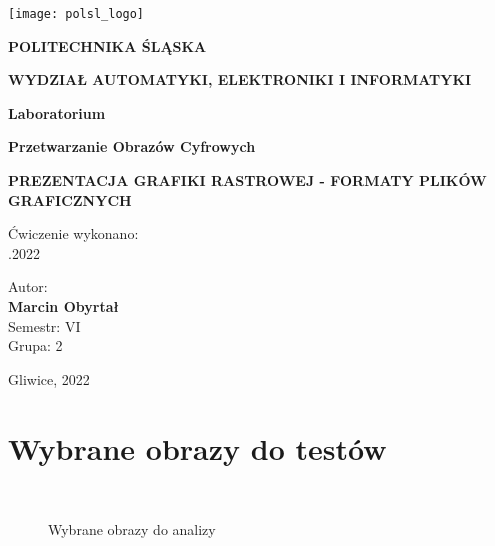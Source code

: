 \documentclass[a4paper, 12pt]{article}
\begin{document}
\begin{titlepage}
\newcommand{\ww}{0.32}
\begin{center}
\texttt{[image: polsl\_logo]}
\bigskip

\Large{ \textbf{POLITECHNIKA ŚLĄSKA}

\textbf{WYDZIAŁ AUTOMATYKI, ELEKTRONIKI I INFORMATYKI} }
\bigskip
\bigskip
\bigskip
\bigskip

\textbf{Laboratorium}
\medskip

\textbf{Przetwarzanie Obrazów Cyfrowych}
\bigskip
\bigskip
\bigskip
\bigskip

\large{ \textbf{PREZENTACJA GRAFIKI RASTROWEJ - FORMATY PLIKÓW GRAFICZNYCH}}

\vspace{2cm}

\centering Ćwiczenie wykonano:\\
.2022

\vfill

\normalsize

\vspace{5cm}

\begin{flushleft}
\hspace{12.5cm}Autor: \\
\hspace{12.5cm}\textbf{Marcin Obyrtał} \\

\hspace{12.5cm}Semestr: VI \\

\hspace{12.5cm}Grupa: 2 \\

\end{flushleft}

\medskip

\vspace*{\fill}        Gliwice, 2022

\end{center}

\end{titlepage}

\section{Wybrane obrazy do testów}

\newcommand{\ww}{0.32}

\begin{figure}[h]

\captionsetup[subfloat]{position=bottom,labelformat=empty} 
\hfill
{}
\hfill
{}\\

\caption{Wybrane obrazy do analizy}

\label{fig:fig1}
\end{figure}
\end{document}
